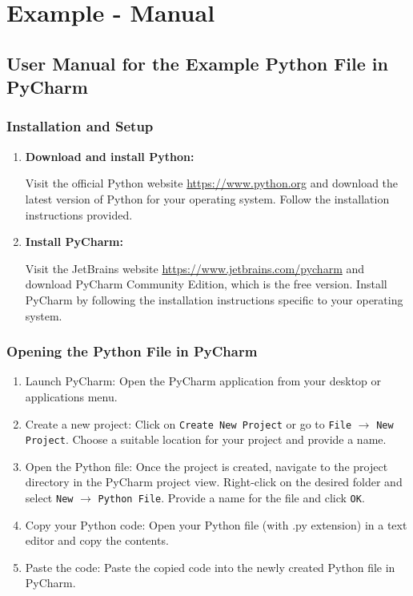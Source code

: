 \section{Example - Manual}

\subsection{User Manual for the Example Python File in PyCharm}

\subsubsection{Installation and Setup}

\begin{enumerate}
	\item \textbf{Download and install Python:}
	
	Visit the official Python website \url{https://www.python.org} and download the
	latest version of Python for your operating system. Follow the installation
	instructions provided.
	
	\item \textbf{Install PyCharm: }
	
	Visit the JetBrains website \url{https://www.jetbrains.com/pycharm} and download
	PyCharm Community Edition, which is the free version. Install PyCharm by following
	the installation instructions specific to your operating system.
\end{enumerate}

\subsubsection{Opening the Python File in PyCharm}

\begin{enumerate}
	\item Launch PyCharm: Open the PyCharm application from your desktop or
	applications menu.
	
	\item Create a new project: Click on \texttt{Create New Project} or go to \texttt{File}
	$\rightarrow$ \texttt{New Project}. Choose a suitable location for your
	project and provide a name.
	
	\item Open the Python file: Once the project is created, navigate to the project
	directory in the PyCharm project view. Right-click on the desired folder and
	select \texttt{New} $\rightarrow$ \texttt{Python File}. Provide a name for the
	file and click \texttt{OK}.
	
	\item Copy your Python code: Open your Python file (with .py extension) in a text
	editor and copy the contents.
	
	\item Paste the code: Paste the copied code into the newly created Python file
	in PyCharm.
\end{enumerate}

